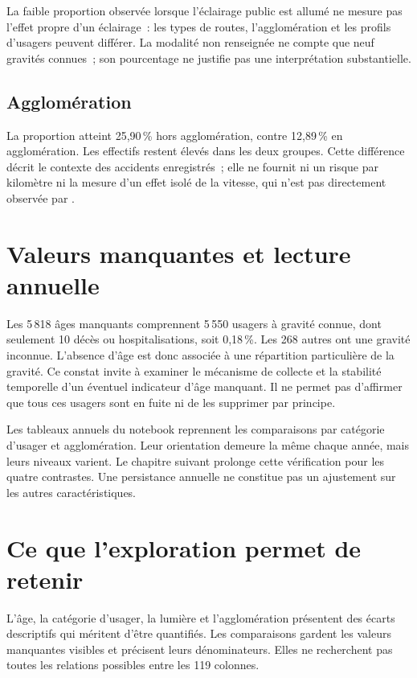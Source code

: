La faible proportion observée lorsque l'éclairage public est allumé ne mesure pas
l'effet propre d'un éclairage~: les types de routes, l'agglomération et les profils
d'usagers peuvent différer. La modalité non renseignée ne compte que neuf gravités
connues~; son pourcentage ne justifie pas une interprétation substantielle.
\FloatBarrier

\subsection{Agglomération}
La proportion atteint 25,90\,\% hors agglomération, contre 12,89\,\% en agglomération.
Les effectifs restent élevés dans les deux groupes. Cette différence décrit le contexte
des accidents enregistrés~; elle ne fournit ni un risque par kilomètre ni la mesure
d'un effet isolé de la vitesse, qui n'est pas directement observée par .

\FloatBarrier

\section{Valeurs manquantes et lecture annuelle}
Les 5\,818 âges manquants comprennent 5\,550 usagers à gravité connue, dont seulement
10 décès ou hospitalisations, soit 0,18\,\%. Les 268 autres ont une gravité inconnue.
L'absence d'âge est donc associée à une répartition particulière de la gravité. Ce
constat invite à examiner le mécanisme de collecte et la stabilité temporelle d'un
éventuel indicateur d'âge manquant. Il ne permet pas d'affirmer que tous ces usagers
sont en fuite ni de les supprimer par principe.

Les tableaux annuels du notebook reprennent les comparaisons par catégorie d'usager
et agglomération. Leur orientation demeure la même chaque année, mais leurs niveaux
varient. Le chapitre suivant prolonge cette vérification pour les quatre contrastes.
Une persistance annuelle ne constitue pas un ajustement sur les autres caractéristiques.

\section{Ce que l'exploration permet de retenir}
L'âge, la catégorie d'usager, la lumière et l'agglomération présentent des écarts
descriptifs qui méritent d'être quantifiés. Les comparaisons gardent les valeurs
manquantes visibles et précisent leurs dénominateurs. Elles ne recherchent pas toutes
les relations possibles entre les 119 colonnes.

